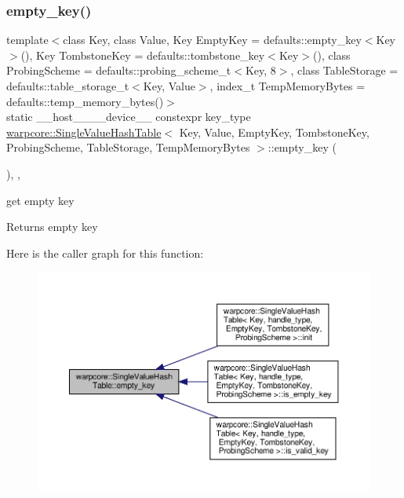 \subsubsection{\texorpdfstring{empty\+\_\+key()}{empty\_key()}}
{\footnotesize\ttfamily template$<$class Key, class Value, Key Empty\+Key = defaults\+::empty\+\_\+key$<$\+Key$>$(), Key Tombstone\+Key = defaults\+::tombstone\+\_\+key$<$\+Key$>$(), class Probing\+Scheme = defaults\+::probing\+\_\+scheme\+\_\+t$<$\+Key, 8$>$, class Table\+Storage = defaults\+::table\+\_\+storage\+\_\+t$<$\+Key, Value$>$, index\+\_\+t Temp\+Memory\+Bytes = defaults\+::temp\+\_\+memory\+\_\+bytes()$>$ \\
static \+\_\+\+\_\+host\+\_\+\+\_\+\+\_\+\+\_\+device\+\_\+\+\_\+ constexpr key\+\_\+type \hyperlink{classwarpcore_1_1SingleValueHashTable}{warpcore\+::\+Single\+Value\+Hash\+Table}$<$ Key, Value, Empty\+Key, Tombstone\+Key, Probing\+Scheme, Table\+Storage, Temp\+Memory\+Bytes $>$\+::empty\+\_\+key (\begin{DoxyParamCaption}{ }\end{DoxyParamCaption})\hspace{0.3cm}{\ttfamily [inline]}, {\ttfamily [static]}, {\ttfamily [noexcept]}}



get empty key 

\begin{DoxyReturn}{Returns}
empty key 
\end{DoxyReturn}
Here is the caller graph for this function\+:
\nopagebreak
\begin{figure}[H]
\begin{center}
\leavevmode
\includegraphics[width=350pt]{classwarpcore_1_1SingleValueHashTable_add0eb4b5b495e044affce46b8cb11021_icgraph}
\end{center}
\end{figure}
\mbox{\label{classwarpcore_1_1SingleValueHashTable_ae11f0157566aced6f9370b36c4c2b433}} 
